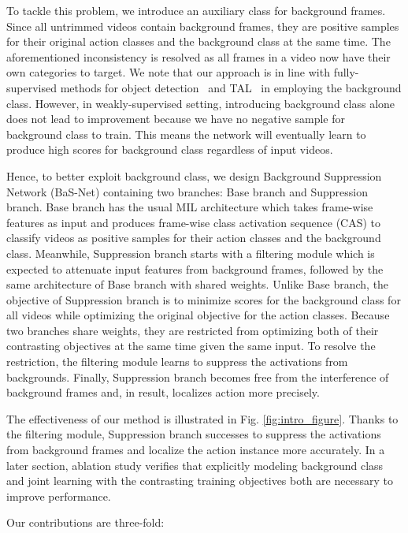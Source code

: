 \documentclass[letterpaper]{article} %
\newcommand{\Fref}[1]{Fig. \ref{#1}}
\begin{document}
To tackle this problem, we introduce an auxiliary class for background frames. Since all untrimmed videos contain background frames, they are positive samples for their original action classes and the background class at the same time. The aforementioned inconsistency is resolved as all frames in a video now have their own categories to target.
We note that our approach is in line with fully-supervised methods for object detection~\cite{ren2015faster,redmon2016you,liu2016ssd} and TAL~\cite{shou2016temporal,zhao2017temporal} in employing the background class.
However, in weakly-supervised setting, introducing background class alone does not lead to improvement because we have no negative sample for background class to train. This means the network will eventually learn to produce high scores for background class regardless of input videos.

Hence, to better exploit background class, we design Background Suppression Network (BaS-Net) containing two branches: Base branch and Suppression branch.
Base branch has the usual MIL architecture which takes frame-wise features as input and produces frame-wise class activation sequence (CAS) to classify videos as positive samples for their action classes and the background class.
Meanwhile, Suppression branch starts with a filtering module which is expected to attenuate input features from background frames, followed by the same architecture of Base branch with shared weights. Unlike Base branch, the objective of Suppression branch is to minimize scores for the background class for all videos while optimizing the original objective for the action classes. Because two branches share weights, they are restricted from optimizing both of their contrasting objectives at the same time given the same input. To resolve the restriction, the filtering module learns to suppress the activations from backgrounds. Finally, Suppression branch becomes free from the interference of background frames and, in result, localizes action more precisely.

The effectiveness of our method is illustrated in \Fref{fig:intro_figure}. Thanks to the filtering module, Suppression branch successes to suppress the activations from background frames and localize the action instance more accurately. In a later section, ablation study verifies that explicitly modeling background class and joint learning with the contrasting training objectives both are necessary to improve performance.

Our contributions are three-fold:
\end{document}
